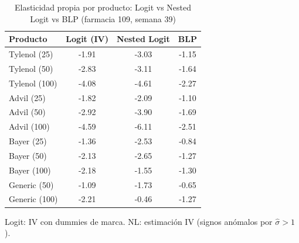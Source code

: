 \begin{table}[H]
\centering
\caption{Elasticidad propia por producto: Logit vs Nested Logit vs BLP (farmacia 109, semana 39)}
\begin{tabular}{lccc}
\toprule
Producto & Logit (IV) & Nested Logit & BLP \\
\midrule
Tylenol (25) & -1.91 & -3.03 & -1.15 \\
Tylenol (50) & -2.83 & -3.11 & -1.64 \\
Tylenol (100) & -4.08 & -4.61 & -2.27 \\
Advil (25) & -1.82 & -2.09 & -1.10 \\
Advil (50) & -2.92 & -3.90 & -1.69 \\
Advil (100) & -4.59 & -6.11 & -2.51 \\
Bayer (25) & -1.36 & -2.53 & -0.84 \\
Bayer (50) & -2.13 & -2.65 & -1.27 \\
Bayer (100) & -2.18 & -1.55 & -1.30 \\
Generic (50) & -1.09 & -1.73 & -0.65 \\
Generic (100) & -2.21 & -0.46 & -1.27 \\
\bottomrule
\end{tabular}

\smallskip
{\footnotesize\begin{minipage}{0.92\linewidth}Logit: IV con dummies de marca. NL: estimaci\'on IV (signos an\'omalos por $\hat{\sigma}>1$).\end{minipage}}
\end{table}
